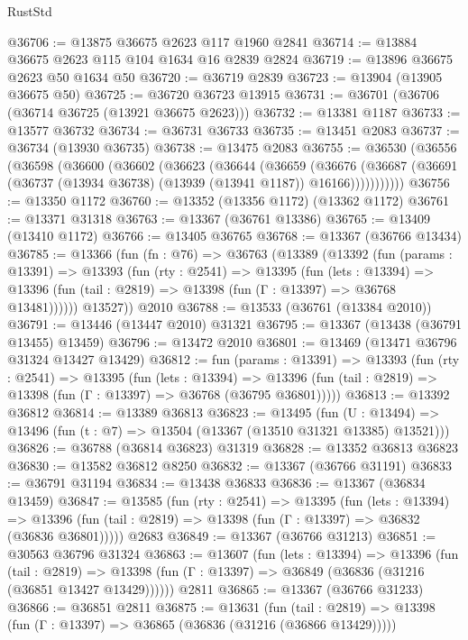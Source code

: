 \begin{lexlean}{RustStd}
\begin{coremodule}
@36706 := @13875 @36675 @2623 @117 @1960 @2841
@36714 := @13884 @36675 @2623 @115 @104 @1634 @16 @2839 @2824
@36719 := @13896 @36675 @2623 @50 @1634 @50
@36720 := @36719 @2839
@36723 := @13904 (@13905 @36675 @50)
@36725 := @36720 @36723 @13915
@36731 := @36701 (@36706 (@36714 @36725 (@13921 @36675 @2623)))
@36732 := @13381 @1187
@36733 := @13577 @36732
@36734 := @36731 @36733
@36735 := @13451 @2083
@36737 := @36734 (@13930 @36735)
@36738 := @13475 @2083
@36755 := @36530
    (@36556
      (@36598
        (@36600
          (@36602
            (@36623
              (@36644
                (@36659
                  (@36676
                    (@36687
                      (@36691 (@36737 (@13934 @36738) (@13939 (@13941 @1187)) @16166)))))))))))
@36756 := @13350 @1172
@36760 := @13352 (@13356 @1172) (@13362 @1172)
@36761 := @13371 @31318
@36763 := @13367 (@36761 @13386)
@36765 := @13409 (@13410 @1172)
@36766 := @13405 @36765
@36768 := @13367 (@36766 @13434)
@36785 := @13366
    (fun (fn : @76) =>
    @36763
      (@13389
        (@13392
          (fun (params : @13391) =>
          @13393
            (fun (rty : @2541) =>
            @13395
              (fun (lets : @13394) =>
              @13396 (fun (tail : @2819) => @13398 (fun (Γ : @13397) => @36768 @13481))))))
        @13527))
    @2010
@36788 := @13533 (@36761 (@13384 @2010))
@36791 := @13446 (@13447 @2010) @31321
@36795 := @13367 (@13438 (@36791 @13455) @13459)
@36796 := @13472 @2010
@36801 := @13469 (@13471 @36796 @31324 @13427 @13429)
@36812 := fun (params : @13391) =>
  @13393
    (fun (rty : @2541) =>
    @13395
      (fun (lets : @13394) =>
      @13396 (fun (tail : @2819) => @13398 (fun (Γ : @13397) => @36768 (@36795 @36801)))))
@36813 := @13392 @36812
@36814 := @13389 @36813
@36823 := @13495
    (fun (U : @13494) => @13496 (fun (t : @7) => @13504 (@13367 (@13510 @31321 @13385) @13521)))
@36826 := @36788 (@36814 @36823) @31319
@36828 := @13352 @36813 @36823
@36830 := @13582 @36812 @8250
@36832 := @13367 (@36766 @31191)
@36833 := @36791 @31194
@36834 := @13438 @36833
@36836 := @13367 (@36834 @13459)
@36847 := @13585
    (fun (rty : @2541) =>
    @13395
      (fun (lets : @13394) =>
      @13396 (fun (tail : @2819) => @13398 (fun (Γ : @13397) => @36832 (@36836 @36801)))))
    @2683
@36849 := @13367 (@36766 @31213)
@36851 := @30563 @36796 @31324
@36863 := @13607
    (fun (lets : @13394) =>
    @13396
      (fun (tail : @2819) =>
      @13398 (fun (Γ : @13397) => @36849 (@36836 (@31216 (@36851 @13427 @13429))))))
    @2811
@36865 := @13367 (@36766 @31233)
@36866 := @36851 @2811
@36875 := @13631
    (fun (tail : @2819) => @13398 (fun (Γ : @13397) => @36865 (@36836 (@31216 (@36866 @13429)))))

\end{coremodule}
\end{lexlean}
